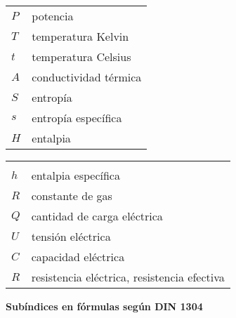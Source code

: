 \begin{mytable}[H]
\begin{tabular}{ll}
		$P$ & potencia \\
		$T$ & temperatura Kelvin \\
		$t$ & temperatura Celsius \\
		$A$ & conductividad térmica \\
		$S$ & entropía \\
		$s$ & entropía específica \\
		$H$ & entalpia \\
	\end{tabular}
\end{mytable}

\newpage 

\begin{mytable}[H]
	\centering
	\begin{tabular}{ll}
		\multicolumn{1}{c}{\quad\quad\quad} & \multicolumn{1}{c}{} \\
		$h$ \quad\quad\quad& entalpia específica \\	
		$R$ & constante de gas \\
		$Q$ & cantidad de carga eléctrica \\
		$U$ & tensión eléctrica \\
		$C$ & capacidad eléctrica \\
		$R$ & resistencia eléctrica, resistencia efectiva \\
	\end{tabular}
\end{mytable}

\begin{center}
	\textbf{Subíndices en fórmulas según DIN 1304}
\end{center}

